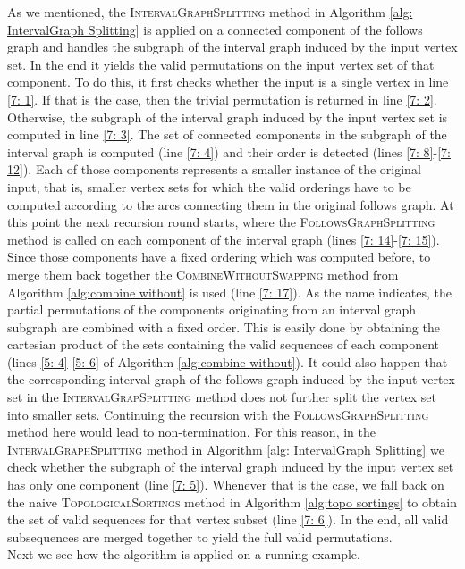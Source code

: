 As we mentioned, the \textsc{IntervalGraphSplitting} method in Algorithm \ref{alg: IntervalGraph Splitting} is applied on a connected component of the follows graph and handles the subgraph of the interval graph induced by the input vertex set. 
In the end it yields the valid permutations on the input vertex set of that component.
To do this, it first checks whether the input is a single vertex in line \ref{7: 1}.
If that is the case, then the trivial permutation is returned in line \ref{7: 2}.
Otherwise, the subgraph of the interval graph induced by the input vertex set is computed in line \ref{7: 3}.
The set of connected components in the subgraph of the interval graph is computed (line \ref{7: 4}) and their order is detected (lines \ref{7: 8}-\ref{7: 12}).
Each of those components represents a smaller instance of the original input, that is, smaller vertex sets for which the valid orderings have to be computed according to the arcs connecting them in the original follows graph.
At this point the next recursion round starts, where the \textsc{FollowsGraphSplitting} method is called on each component of the interval graph (lines \ref{7: 14}-\ref{7: 15}).
Since those components have a fixed ordering which was computed before, to merge them back together the \textsc{CombineWithoutSwapping} method from Algorithm \ref{alg:combine without} is used (line \ref{7: 17}).
As the name indicates, the partial permutations of the components originating from an interval graph subgraph are combined with a fixed order.
This is easily done by obtaining the cartesian product of the sets containing the valid sequences of each component (lines \ref{5: 4}-\ref{5: 6} of Algorithm \ref{alg:combine without}).
It could also happen that the corresponding interval graph of the follows graph induced by the input vertex set in the \textsc{IntervalGrapSplitting} method does not further split the vertex set into smaller sets.
Continuing the recursion with the \textsc{FollowsGraphSplitting} method here would lead to non-termination.
For this reason, in the \textsc{IntervalGraphSplitting} method in Algorithm \ref{alg: IntervalGraph Splitting} we check whether the subgraph of the interval graph induced by the input vertex set has only one component (line \ref{7: 5}). 
Whenever that is the case, we fall back on the naive \textsc{TopologicalSortings} method in Algorithm \ref{alg:topo sortings} to obtain the set of valid sequences for that vertex subset (line \ref{7: 6}).
In the end, all valid subsequences are merged together to yield the full valid permutations.\\
Next we see how the algorithm is applied on a running example. 
%
%
%
%
%

